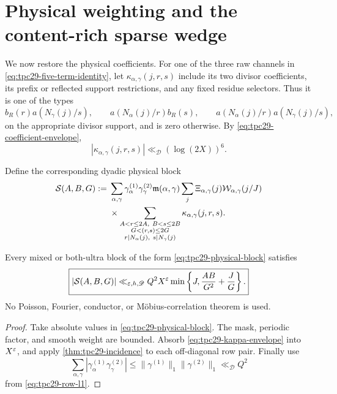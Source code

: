 \section{Physical weighting and the content-rich sparse wedge}
\label{sec:tpc29-weighted-wedge}

We now restore the physical coefficients.  For one of the three raw
channels in \eqref{eq:tpc29-five-term-identity}, let
$\kappa_{\alpha,\gamma}(j,r,s)$ include its two divisor coefficients,
its prefix or reflected support restrictions, and any fixed residue
selectors.  Thus it is one of the types
\begin{equation}
 b_R(r)a(N_\gamma(j)/s),\qquad
 a(N_\alpha(j)/r)b_R(s),\qquad
 a(N_\alpha(j)/r)a(N_\gamma(j)/s),
 \label{eq:tpc29-three-coefficient-types}
\end{equation}
on the appropriate divisor support, and is zero otherwise.  By
\eqref{eq:tpc29-coefficient-envelope},
\begin{equation}
 |\kappa_{\alpha,\gamma}(j,r,s)|
 \ll_{\mathscr D}(\log(2X))^6.
 \label{eq:tpc29-kappa-envelope}
\end{equation}

Define the corresponding dyadic physical block
\begin{align}
 \mathcal S(A,B,G)
 :={}&\sum_{\alpha,\gamma}
 \gamma_\alpha^{(1)}\gamma_\gamma^{(2)}
 \mathfrak m(\alpha,\gamma)
 \sum_j\Xi_{\alpha,\gamma}(j)
 \mathcal W_{\alpha,\gamma}(j/J)
 \notag\\
 &\times
 \sum_{\substack{A<r\le2A,\ B<s\le2B\\
                   G<(r,s)\le2G\\
                   r\mid N_\alpha(j),\ s\mid N_\gamma(j)}}
 \kappa_{\alpha,\gamma}(j,r,s).
 \label{eq:tpc29-physical-block}
\end{align}

\begin{theorem}
\label{thm:tpc29-weighted-block}
Every mixed or both-ultra block of the form
\eqref{eq:tpc29-physical-block} satisfies
\begin{equation}
 \boxed{
 |\mathcal S(A,B,G)|
 \ll_{\varepsilon,h,\mathscr D}Q^2X^\varepsilon
 \min\left\{J,\frac{AB}{G^2}+\frac JG\right\}.}
 \label{eq:tpc29-weighted-block-bound}
\end{equation}
No Poisson, Fourier, conductor, or M\"obius-correlation theorem is used.
\end{theorem}

\begin{proof}
Take absolute values in \eqref{eq:tpc29-physical-block}.  The mask,
periodic factor, and smooth weight are bounded.  Absorb
\eqref{eq:tpc29-kappa-envelope} into $X^\varepsilon$, and apply
\cref{thm:tpc29-incidence} to each off-diagonal row pair.  Finally use
\[
 \sum_{\alpha,\gamma}
 |\gamma_\alpha^{(1)}\gamma_\gamma^{(2)}|
 \le
 \|\gamma^{(1)}\|_1\|\gamma^{(2)}\|_1
 \ll_{\mathscr D}Q^2
\]
from \eqref{eq:tpc29-row-l1}.
\end{proof}

